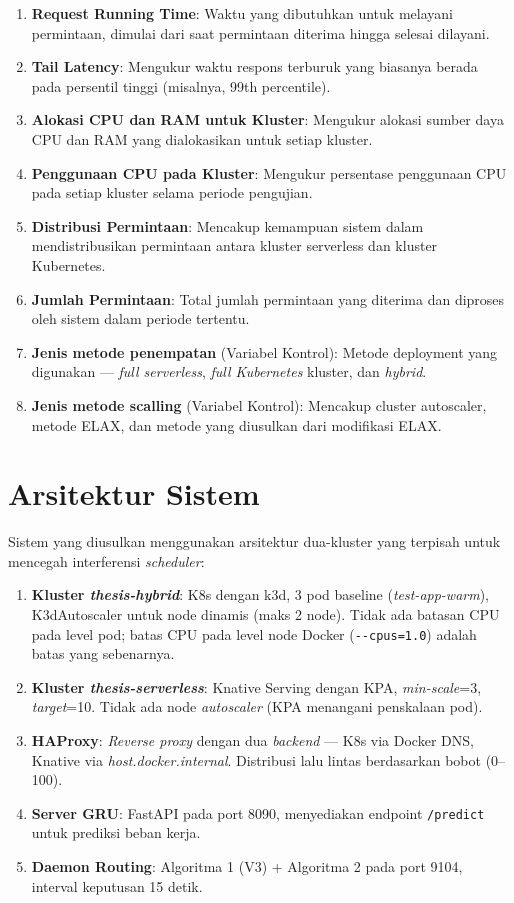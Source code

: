 \begin{enumerate}
    \item \textbf{Request Running Time}: Waktu yang dibutuhkan untuk melayani permintaan, dimulai dari saat permintaan diterima hingga selesai dilayani.
    \item \textbf{Tail Latency}: Mengukur waktu respons terburuk yang biasanya berada pada persentil tinggi (misalnya, 99th percentile).
    \item \textbf{Alokasi CPU dan RAM untuk Kluster}: Mengukur alokasi sumber daya CPU dan RAM yang dialokasikan untuk setiap kluster.
    \item \textbf{Penggunaan CPU pada Kluster}: Mengukur persentase penggunaan CPU pada setiap kluster selama periode pengujian.
    \item \textbf{Distribusi Permintaan}: Mencakup kemampuan sistem dalam mendistribusikan permintaan antara kluster serverless dan kluster Kubernetes.
    \item \textbf{Jumlah Permintaan}: Total jumlah permintaan yang diterima dan diproses oleh sistem dalam periode tertentu.
    \item \textbf{Jenis metode penempatan} (Variabel Kontrol): Metode deployment yang digunakan --- \emph{full serverless}, \emph{full Kubernetes} kluster, dan \emph{hybrid}.
    \item \textbf{Jenis metode scalling} (Variabel Kontrol): Mencakup cluster autoscaler, metode ELAX, dan metode yang diusulkan dari modifikasi ELAX.
\end{enumerate}

\section{Arsitektur Sistem}
\label{sec:arsitektur-sistem}

Sistem yang diusulkan menggunakan arsitektur dua-kluster yang terpisah untuk mencegah interferensi \emph{scheduler}:

\begin{enumerate}
    \item \textbf{Kluster \emph{thesis-hybrid}}: K8s dengan k3d, 3 pod baseline (\emph{test-app-warm}), K3dAutoscaler untuk node dinamis (maks 2 node). Tidak ada batasan CPU pada level pod; batas CPU pada level node Docker (\texttt{-{}-cpus=1.0}) adalah batas yang sebenarnya.
    \item \textbf{Kluster \emph{thesis-serverless}}: Knative Serving dengan KPA, \emph{min-scale}=3, \emph{target}=10. Tidak ada node \emph{autoscaler} (KPA menangani penskalaan pod).
    \item \textbf{HAProxy}: \emph{Reverse proxy} dengan dua \emph{backend} — K8s via Docker DNS, Knative via \emph{host.docker.internal}. Distribusi lalu lintas berdasarkan bobot (0--100).
    \item \textbf{Server GRU}: FastAPI pada port 8090, menyediakan endpoint \texttt{/predict} untuk prediksi beban kerja.
    \item \textbf{Daemon Routing}: Algoritma 1 (V3) + Algoritma 2 pada port 9104, interval keputusan 15 detik.
\end{enumerate}

